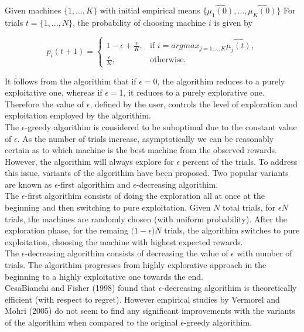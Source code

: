 \documentclass{article}
\begin{document}
Given machines $\{1,...,K\}$ with initial empirical means $\{\hat{\mu_1(0)},...,\hat{\mu_K(0)}\}$ For trials $t = \{1,...,N\}$, the probability of choosing machine $i$ is given by

$$p_i(t+1) = \begin{cases}
  1- \epsilon + \frac{\epsilon}{K}, & \text{if } i = argmax_{j=1,..,K}\hat{\mu_j(t)}, \\
  \frac{\epsilon}{K}, & \text{otherwise}.
\end{cases}$$


It follows from the algorithim that if $\epsilon = 0$, the algorithim reduces to a purely exploitative one, whereas if $\epsilon = 1$, it reduces to a purely explorative one. Therefore the value of $\epsilon$, defined by the user, controls the level of exploration and exploitation employed by the algorithim.\\

The $\epsilon$-greedy algorithim is considered to be suboptimal due to the constant value of $\epsilon$. As the number of trials increase, asymptotically we can be reasonably certain as to which machine is the best machine from the observed rewards. However, the algorithim will always explore for $\epsilon$ percent of the trials. To address this issue, variants of the algorithim have been proposed. Two popular variants are known as $\epsilon$-first algorithim and $\epsilon$-decreasing algorithim.\\

The $\epsilon$-first algorithim consists of doing the exploration all at once at the beginning and then switching to pure exploitation. Given $N$ total trials, for $\epsilon N$ trials, the machines are randomly chosen (with uniform probability). After the exploration phase, for the remaing $\big( 1-\epsilon \big) N$ trials, the algorithim switches to pure exploitation, choosing the machine with highest expected rewards.\\

The $\epsilon$-decreasing algorithim consists of decreasing the value of $\epsilon$ with number of trials. The algorithim progresses from highly explorative approach in the beginning to a highly exploitative one towards the end.\\

CesaBianchi and Fisher (1998) found that $\epsilon$-decreasing algorithim is theoretically efficient (with respect to regret). However empirical studies by Vermorel and Mohri (2005) do not seem to find any significant improvements with the variants of the algorithim when compared to the original $\epsilon$-greedy algorithim.\\
\end{document}
